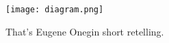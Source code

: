 \documentclass[margin=5mm]{standalone}
\begin{document}
    \texttt{[image: diagram.png]}
    
    That's Eugene Onegin short retelling.
    
\end{document}
